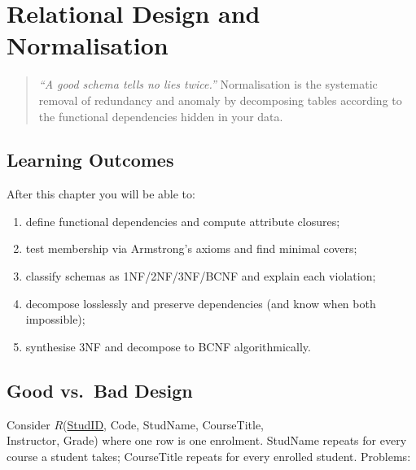 \chapter{Relational Design and Normalisation}
\label{ch:normalization}

\begin{quote}
\emph{``A good schema tells no lies twice.''} Normalisation is the systematic removal of redundancy and anomaly by decomposing tables according to the functional dependencies hidden in your data.
\end{quote}

\noindent{}
\vspace{0.4em}

\section*{Learning Outcomes}
After this chapter you will be able to:
\begin{enumerate}[label=(L\arabic*)]
    \item define functional dependencies and compute attribute closures;
    \item test membership via Armstrong's axioms and find minimal covers;
    \item classify schemas as 1NF/2NF/3NF/BCNF and explain each violation;
    \item decompose losslessly and preserve dependencies (and know when both impossible);
    \item synthesise 3NF and decompose to BCNF algorithmically.
\end{enumerate}

\section{Good vs.\ Bad Design}
\label{sec:bad-design}

Consider $R$(\underline{StudID}, Code, StudName, CourseTitle,\\ Instructor, Grade) where one row is one enrolment. StudName repeats for every course a student takes; CourseTitle repeats for every enrolled student. Problems:

